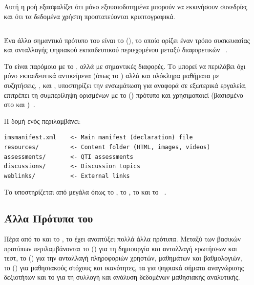 Αυτή η ροή εξασφαλίζει ότι μόνο εξουσιοδοτημένα  μπορούν να εκκινήσουν συνεδρίες και ότι τα δεδομένα χρήστη προστατεύονται κρυπτογραφικά.

\subsection{ }
\label{subsec:common_cartridge}

Ένα άλλο σημαντικό πρότυπο του  είναι το \textit{ } (), το οποίο ορίζει έναν τρόπο συσκευασίας και ανταλλαγής ψηφιακού εκπαιδευτικού περιεχομένου μεταξύ διαφορετικών ~\cite{ims2015cc,ims2015ccfaq}.

Το   είναι παρόμοιο με το , αλλά με σημαντικές διαφορές. Το  μπορεί να περιλάβει όχι μόνο εκπαιδευτικά αντικείμενα (όπως το ) αλλά και ολόκληρα μαθήματα με συζητήσεις, ,  και , υποστηρίζει την ενσωμάτωση   για αναφορά σε εξωτερικά εργαλεία, επιτρέπει τη συμπερίληψη  ορισμένων με το      () πρότυπο και χρησιμοποιεί    (βασισμένο στο   και  )~\cite{coursearc2024cc}.

Η δομή ενός   περιλαμβάνει:

{\selectfont

\begin{verbatim}
imsmanifest.xml    <- Main manifest (declaration) file
resources/         <- Content folder (HTML, images, videos)
assessments/       <- QTI assessments
discussions/       <- Discussion topics
weblinks/          <- External links
\end{verbatim}
}

Το   υποστηρίζεται από μεγάλα  όπως το , το , το  και το  ~\cite{blackboard2024cc,moodle2024cc}.

\subsection{Άλλα Πρότυπα του }

Πέρα από το  και το  , το  έχει αναπτύξει πολλά άλλα πρότυπα. Μεταξύ των βασικών προτύπων περιλαμβάνονται το     () για τη δημιουργία και ανταλλαγή ερωτήσεων και τεστ, το    () για την ανταλλαγή πληροφοριών χρηστών, μαθημάτων και βαθμολογιών, το      () για μαθησιακούς στόχους και ικανότητες, τα   για ψηφιακά σήματα αναγνώρισης δεξιοτήτων και το   για τη συλλογή και ανάλυση δεδομένων μαθησιακής αναλυτικής.

